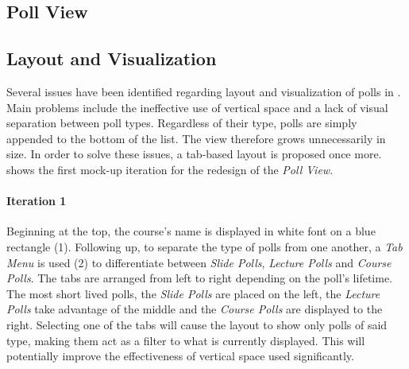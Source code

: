 \subsection{Poll View}
\label{section:con:proposals:pollview}

\subsection{Layout and Visualization}
Several issues have been identified regarding layout and visualization of polls in . Main problems include the ineffective use of vertical space and a lack of visual separation between poll types. Regardless of their type, polls are simply appended to the bottom of the list.
The view therefore grows unnecessarily in size.
In order to solve these issues, a tab-based layout is proposed once more. 
  shows the first mock-up iteration for the redesign of the \emph{Poll View}.
\paragraph{Iteration 1}
Beginning at the top, the course's name is displayed in white font on a blue rectangle (1). Following up, to separate the type of polls from one another, a \emph{Tab Menu} is used (2) to differentiate between \emph{Slide Polls}, \emph{Lecture Polls} and \emph{Course Polls}. The tabs are arranged from left to right depending on the poll's lifetime. The most short lived polls, the \emph{Slide Polls} are placed on the left, the \emph{Lecture Polls} take advantage of the middle and the \emph{Course Polls} are displayed to the right. Selecting one of the tabs will cause the layout to show only polls of said type, making them act as a filter to what is currently displayed. This will potentially improve the effectiveness of vertical space used significantly. 

